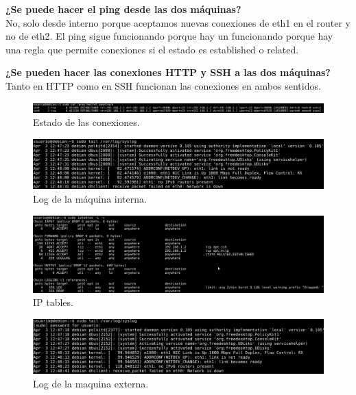\documentclass[11pt]{article}
\begin{document}
      \par
      \textbf{¿Se puede hacer el ping desde las dos máquinas?}\\
      No, solo desde interno porque aceptamos nuevas conexiones de eth1 en el
      router y no de eth2. El ping sigue funcionando porque hay un funcionando
      porque hay una regla que permite conexiones si el estado es established o
      related.

      \bigskip
      \par
      \textbf{¿Se pueden hacer las conexiones HTTP y SSH a las dos máquinas?}\\
      Tanto en HTTP como en SSH funcionan las conexiones en ambos sentidos.

      \begin{figure}[H]
        \centering
        \includegraphics[width = \textwidth]{ssh}
        \caption{Estado de las conexiones.}
      \end{figure}

      \begin{figure}[H]
        \centering
        \includegraphics[width = \textwidth]{loginterno}
        \caption{Log de la máquina interna.}
      \end{figure}

      \begin{figure}[H]
        \centering
        \includegraphics[width = \textwidth]{iptables}
        \caption{IP tables.}
      \end{figure}

      \begin{figure}[H]
        \centering
        \includegraphics[width = \textwidth]{logexterno}
        \caption{Log de la maquina externa.}
      \end{figure}
\end{document}
